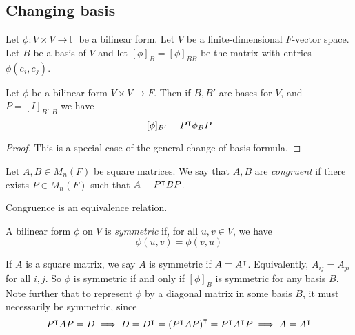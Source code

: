 \subsection{Changing basis}
Let \( \phi \colon V \times V \to \mathbb F \) be a bilinear form.
Let \( V \) be a finite-dimensional \( F \)-vector space.
Let \( B \) be a basis of \( V \) and let \( [\phi]_B = [\phi]_{BB} \) be the matrix with entries \( \phi(e_i, e_j) \).
\begin{lemma}
	Let \( \phi \) be a bilinear form \( V \times V \to F \).
	Then if \( B, B' \) are bases for \( V \), and \( P = [I]_{B', B} \) we have
	\[
		[\phi]_{B'} = P^\intercal \phi_B P
	\]
\end{lemma}
\begin{proof}
	This is a special case of the general change of basis formula.
\end{proof}
\begin{definition}
	Let \( A, B \in M_n(F) \) be square matrices.
	We say that \( A, B \) are \textit{congruent} if there exists \( P \in M_n(F) \) such that \( A = P^\intercal B P \).
\end{definition}
\begin{remark}
	Congruence is an equivalence relation.
\end{remark}
\begin{definition}
	A bilinear form \( \phi \) on \( V \) is \textit{symmetric} if, for all \( u, v \in V \), we have
	\[
		\phi(u,v) = \phi(v,u)
	\]
\end{definition}
\begin{remark}
	If \( A \) is a square matrix, we say \( A \) is symmetric if \( A = A^\intercal \).
	Equivalently, \( A_{ij} = A_{ji} \) for all \( i, j \).
	So \( \phi \) is symmetric if and only if \( [\phi]_B \) is symmetric for any basis \( B \).
	Note further that to represent \( \phi \) by a diagonal matrix in some basis \( B \), it must necessarily be symmetric, since
	\[
		P^\intercal A P = D \implies D = D^\intercal = \qty(P^\intercal A P)^\intercal = P^\intercal A^\intercal P \implies A = A^\intercal
	\]
\end{remark}

